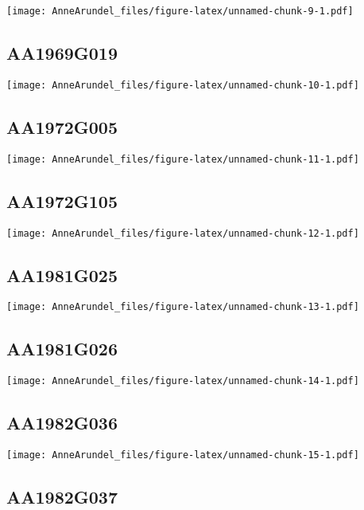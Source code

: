 \documentclass[
]{article}
\begin{document}
\texttt{[image: AnneArundel\_files/figure-latex/unnamed-chunk-9-1.pdf]}

\hypertarget{aa1969g019}{%
\subsection{AA1969G019}\label{aa1969g019}}

\texttt{[image: AnneArundel\_files/figure-latex/unnamed-chunk-10-1.pdf]}

\hypertarget{aa1972g005}{%
\subsection{AA1972G005}\label{aa1972g005}}

\texttt{[image: AnneArundel\_files/figure-latex/unnamed-chunk-11-1.pdf]}

\hypertarget{aa1972g105}{%
\subsection{AA1972G105}\label{aa1972g105}}

\texttt{[image: AnneArundel\_files/figure-latex/unnamed-chunk-12-1.pdf]}

\hypertarget{aa1981g025}{%
\subsection{AA1981G025}\label{aa1981g025}}

\texttt{[image: AnneArundel\_files/figure-latex/unnamed-chunk-13-1.pdf]}

\hypertarget{aa1981g026}{%
\subsection{AA1981G026}\label{aa1981g026}}

\texttt{[image: AnneArundel\_files/figure-latex/unnamed-chunk-14-1.pdf]}

\hypertarget{aa1982g036}{%
\subsection{AA1982G036}\label{aa1982g036}}

\texttt{[image: AnneArundel\_files/figure-latex/unnamed-chunk-15-1.pdf]}

\hypertarget{aa1982g037}{%
\subsection{AA1982G037}\label{aa1982g037}}
\end{document}
